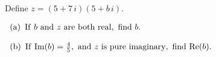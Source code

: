 Define $z=(5+7\,i)(5+b\,i)$.

$
\begin{array}[h!]{l}
{\rm (a)}\hskip5pt {\rm If}\ b\ {\rm and}\ z\ {\rm are\ both\ real,\ find}\ b.\\
\noalign{\vskip12pt}
{\rm (b)}\hskip5pt {\rm If}\ {\rm Im}(b)={4\over5},\ {\rm and}\ z\ {\rm is\ pure\ imaginary,\ find}\
{\rm Re}(b).
\end{array}
$